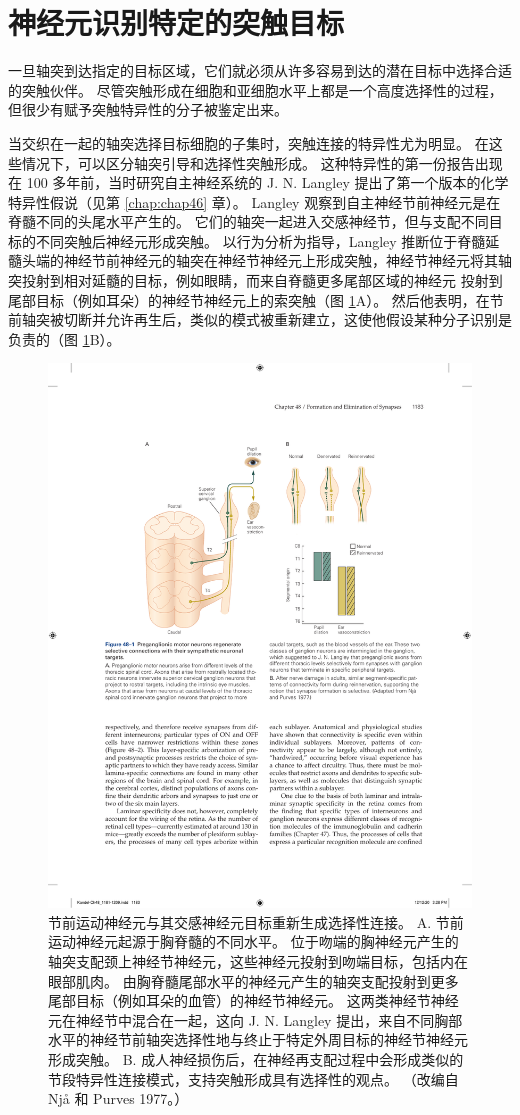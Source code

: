 \section{神经元识别特定的突触目标}

一旦轴突到达指定的目标区域，它们就必须从许多容易到达的潜在目标中选择合适的突触伙伴。
尽管突触形成在细胞和亚细胞水平上都是一个高度选择性的过程，但很少有赋予突触特异性的分子被鉴定出来。


当交织在一起的轴突选择目标细胞的子集时，突触连接的特异性尤为明显。
在这些情况下，可以区分轴突引导和选择性突触形成。
这种特异性的第一份报告出现在 100 多年前，当时研究自主神经系统的 J. N. Langley 提出了第一个版本的化学特异性假说（见第 \ref{chap:chap46} 章）。
Langley 观察到自主神经节前神经元是在脊髓不同的头尾水平产生的。
它们的轴突一起进入交感神经节，但与支配不同目标的不同突触后神经元形成突触。
以行为分析为指导，Langley 推断位于脊髓延髓头端的神经节前神经元的轴突在神经节神经元上形成突触，神经节神经元将其轴突投射到相对延髓的目标，例如眼睛，而来自脊髓更多尾部区域的神经元 投射到尾部目标（例如耳朵）的神经节神经元上的索突触（图 \ref{fig:48_1}A）。
然后他表明，在节前轴突被切断并允许再生后，类似的模式被重新建立，这使他假设某种分子识别是负责的（图 \ref{fig:48_1}B）。


\begin{figure}[htbp]
	\centering
	\includegraphics[width=0.8\linewidth]{chap48/fig_48_1}
	\caption{节前运动神经元与其交感神经元目标重新生成选择性连接。 A. 节前运动神经元起源于胸脊髓的不同水平。 位于吻端的胸神经元产生的轴突支配颈上神经节神经元，这些神经元投射到吻端目标，包括内在眼部肌肉。 由胸脊髓尾部水平的神经元产生的轴突支配投射到更多尾部目标（例如耳朵的血管）的神经节神经元。 这两类神经节神经元在神经节中混合在一起，这向 J. N. Langley 提出，来自不同胸部水平的神经节前轴突选择性地与终止于特定外周目标的神经节神经元形成突触。 B. 成人神经损伤后，在神经再支配过程中会形成类似的节段特异性连接模式，支持突触形成具有选择性的观点。 （改编自 Njå 和 Purves 1977。）}
	\label{fig:48_1}
\end{figure}


